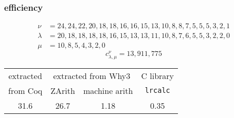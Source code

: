 \documentclass{beamer}
\begin{document}
\begin{frame}\frametitle{efficiency}
  \begin{displaymath}
    \begin{array}{ll}
      \nu & = 24,24,22,20,18,18,16,16,15,13,10,8,8,7,5,5,5,3,2,1 \\
      \lambda & = 20,18,18,18,18,16,15,13,13,11,10,8,7,6,5,5,3,2,2,0 \\
      \mu & = 10,8,5,4,3,2,0
    \end{array}
  \end{displaymath}
  \begin{displaymath}
    c_{\lambda, \mu}^{\nu} = 13,911,775
  \end{displaymath}
  \begin{center}
    \begin{tabular}{|c|c|c|c|}
      \hline
      extracted & \multicolumn{2}{|c|}{extracted from Why3} & C library \\
      \cline{2-3}
      from Coq  &   ZArith  & machine arith & \texttt{lrcalc} \\
      \hline\hline
      31.6      &    26.7   & 1.18 & 0.35 \\
      \hline
    \end{tabular}
  \end{center}
\end{frame}
\end{document}
